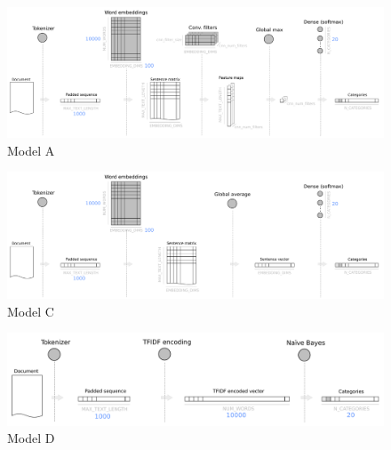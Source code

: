 \documentclass[10pt,journal,compsoc, onecolumn]{IEEEtran}
\begin{document}
\begin{figure}[p]
    \includegraphics[width=\linewidth]{images/models02.pdf}
    \caption{Model A}
    \label{fig:modelA}
\end{figure}
\begin{figure}[p]
    \includegraphics[width=\linewidth]{images/models03.pdf}
    \caption{Model C}
    \label{fig:modelC}
\end{figure}
\begin{figure}[p]
    \includegraphics[width=\linewidth]{images/models04.pdf}
    \caption{Model D}
    \label{fig:modelD}
\end{figure}
\end{document}
